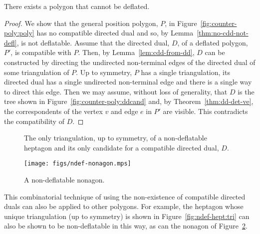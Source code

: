 \documentclass{amsart}
\begin{document}
\begin{theorem}
  There exists a polygon that cannot be deflated.
\end{theorem}
\begin{proof}
  We show that the general position polygon, $P$, in
  Figure~\ref{fig:counter-poly:poly} has no compatible directed dual
  and so, by Lemma~\ref{thm:no-cdd-not-defl}, is not deflatable.
  Assume that the directed dual, $D$, of a deflated polygon, $P'$, is
  compatible with $P$.  Then, by Lemma~\ref{lem:cdd-from-dd}, $D$ can
  be constructed by directing the undirected non-terminal edges of the
  directed dual of some triangulation of $P$.  Up to symmetry, $P$ has
  a single triangulation, its directed dual has a single undirected
  non-terminal edge and there is a single way to direct this edge.
  Then we may assume, without loss of generality, that $D$ is the tree
  shown in Figure~\ref{fig:counter-poly:ddcand} and, by
  Theorem~\ref{thm:dd-det-ve}, the correspondents of the vertex $v$
  and edge $e$ in $P'$ are visible.  This contradicts the
  compatibility of $D$.
\end{proof}


\iffullversion

\begin{figure}[htb]
  \centering
  \quad
  \caption{\protect{} The only triangulation,
    up to symmetry, of a non-deflatable heptagon
    and \protect{} its only candidate for a
    compatible directed dual, $D$.}
  \label{fig:ndef-hept}
\end{figure}

\begin{figure}[htb]
  \centering
  \texttt{[image: figs/ndef-nonagon.mps]}
  \caption{A non-deflatable nonagon.}
  \label{fig:ndef-non}
\end{figure}

This combinatorial technique of using the non-existence of compatible
directed duals can also be applied to other polygons.  For example,
the heptagon whose unique triangulation (up to symmetry) is shown in
Figure~\ref{fig:ndef-hept:tri} can also be shown to be non-deflatable
in this way, as can the nonagon of Figure~\ref{fig:ndef-non}.
\end{document}
